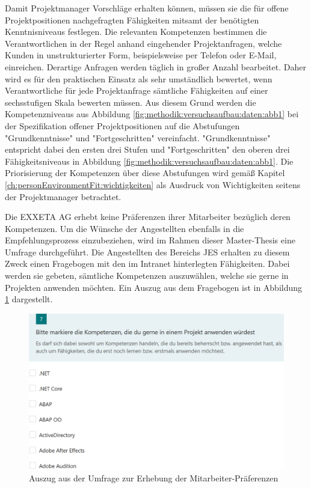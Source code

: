 Damit Projektmanager Vorschläge erhalten können, müssen sie die für offene Projektpositionen nachgefragten Fähigkeiten mitsamt der benötigten Kenntnisniveaus festlegen. Die relevanten Kompetenzen bestimmen die Verantwortlichen in der Regel anhand eingehender Projektanfragen, welche Kunden in unstrukturierter Form, beispielsweise per Telefon oder E-Mail, einreichen. Derartige Anfragen werden täglich in großer Anzahl bearbeitet. Daher wird es für den praktischen Einsatz als sehr umständlich bewertet, wenn Verantwortliche für jede Projektanfrage sämtliche Fähigkeiten auf einer sechsstufigen Skala bewerten müssen. Aus diesem Grund werden die Kompetenzniveaus aus Abbildung \ref{fig:methodik:versuchsaufbau:daten:abb1} bei der Spezifikation offener Projektpositionen auf die Abstufungen "Grundkenntnisse" und "Fortgeschritten" vereinfacht. "Grundkenntnisse" entspricht dabei den ersten drei Stufen und "Fortgeschritten" den oberen drei Fähigkeitsniveaus in Abbildung \ref{fig:methodik:versuchsaufbau:daten:abb1}. Die Priorisierung der Kompetenzen über diese Abstufungen wird gemäß Kapitel \ref{ch:personEnvironmentFit:wichtigkeiten} als Ausdruck von Wichtigkeiten seitens der Projektmanager betrachtet.

Die EXXETA AG erhebt keine Präferenzen ihrer Mitarbeiter bezüglich deren Kompetenzen. Um die Wünsche der Angestellten ebenfalls in die Empfehlungsprozess einzubeziehen, wird im Rahmen dieser Master-Thesis eine Umfrage durchgeführt. Die Angestellten des Bereichs \acl{JES} erhalten zu diesem Zweck einen Fragebogen mit den \anzFaehigkeiten im Intranet hinterlegten Fähigkeiten. Dabei werden sie gebeten, sämtliche Kompetenzen auszuwählen, welche sie gerne in Projekten anwenden möchten. Ein Auszug aus dem Fragebogen ist in Abbildung \ref{fig:methodik:versuchsaufbau:abb1} dargestellt.

\begin{figure}[h]
	\centering
	\includegraphics[width=1\textwidth]{gfx/Umfage_Faehigkeiten.png}
	\caption{Auszug aus der Umfrage zur Erhebung der Mitarbeiter-Präferenzen}
	\label{fig:methodik:versuchsaufbau:abb1}
\end{figure}

